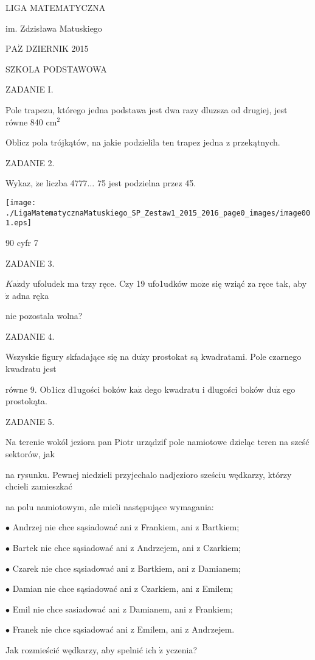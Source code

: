 \documentclass[a4paper,12pt]{article}
\begin{document}
LIGA MATEMATYCZNA

im. Zdzisława Matuskiego

$\mathrm{P}\mathrm{A}\dot{\mathrm{Z}}$ DZIERNIK 2015

SZKOLA PODSTAWOWA

ZADANIE I.

Pole trapezu, którego jedna podstawa jest dwa razy dluzsza od drugiej, jest równe 840 $\mathrm{c}\mathrm{m}^{2}$

Oblicz pola trójkątów, na jakie podzielila ten trapez jedna z przekątnych.

ZADANIE 2.

Wykaz, $\dot{\mathrm{z}}\mathrm{e}$ liczba 4777$\ldots$ 75 jest podzielna przez 45.
\begin{center}
\texttt{[image: ./LigaMatematycznaMatuskiego\_SP\_Zestaw1\_2015\_2016\_page0\_images/image001.eps]}
\end{center}
90 cyfr 7

ZADANIE 3.

$K\mathrm{a}\dot{\mathrm{z}}\mathrm{d}\mathrm{y}$ ufoludek ma trzy ręce. Czy 19 ufo1udków $\mathrm{m}\mathrm{o}\dot{\mathrm{z}}\mathrm{e}$ się wziąć za ręce tak, aby $\dot{\mathrm{z}}$ adna ręka

nie pozostala wolna?

ZADANIE 4.

Wszyskie figury skfadające się na $\mathrm{d}\mathrm{u}\dot{\mathrm{z}}\mathrm{y}$ prostokat są kwadratami. Pole czarnego kwadratu jest

równe 9. Ob1icz d1ugości boków $\mathrm{k}\mathrm{a}\dot{\mathrm{z}}$ dego kwadratu i dlugości boków $\mathrm{d}\mathrm{u}\dot{\mathrm{z}}$ ego prostokąta.

ZADANIE 5.

Na terenie wokól jeziora pan Piotr urządzif pole namiotowe dzieląc teren na sześć sektorów, jak

na rysunku. Pewnej niedzieli przyjechalo nadjezioro sześciu wędkarzy, którzy chcieli zamieszkać

na polu namiotowym, ale mieli następujące wymagania:

$\bullet$ Andrzej nie chce sąsiadować ani z Frankiem, ani z Bartkiem;

$\bullet$ Bartek nie chce sąsiadować ani z Andrzejem, ani z Czarkiem;

$\bullet$ Czarek nie chce sąsiadować ani z Bartkiem, ani z Damianem;

$\bullet$ Damian nie chce sąsiadować ani z Czarkiem, ani z Emilem;

$\bullet$ Emil nie chce sasiadować ani z Damianem, ani z Frankiem;

$\bullet$ Franek nie chce sąsiadować ani z Emilem, ani z Andrzejem.

Jak rozmieścić wędkarzy, aby spelnić ich $\dot{\mathrm{z}}$ yczenia?
\end{document}
